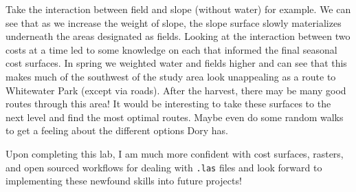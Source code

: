 \documentclass[article,12pt]{article}
\numberwithin{equation}{section}
\begin{document}
Take the interaction between field and slope (without water) for example. We can see that as we increase the weight of slope, the slope surface slowly materializes underneath the areas designated as fields. Looking at the interaction between two costs at a time led to some knowledge on each that informed the final seasonal cost surfaces. In spring we weighted water and fields higher and can see that this makes much of the southwest of the study area look unappealing as a route to Whitewater Park (except via roads). After the harvest, there may be many good routes through this area! It would be interesting to take these surfaces to the next level and find the most optimal routes. Maybe even do some random walks to get a feeling about the different options Dory has.

Upon completing this lab, I am much more confident with cost surfaces, rasters, and open sourced workflows for dealing with \texttt{.las} files and look forward to implementing these newfound skills into future projects!  

\end{document}
